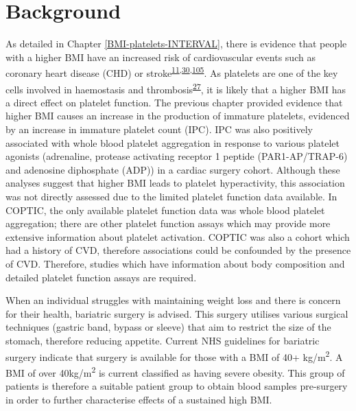 \documentclass[11pt,twoside]{bristolthesis}
\begin{document}
\hypertarget{background-2}{%
\section{Background}\label{background-2}}

As detailed in Chapter \ref{BMI-platelets-INTERVAL}, there is evidence that people with a higher BMI have an increased risk of cardiovascular events such as coronary heart disease (CHD) or stroke\textsuperscript{\protect\hyperlink{ref-Nordestgaard2012}{11},\protect\hyperlink{ref-Dale2017}{30},\protect\hyperlink{ref-Wolk2003a}{105}}. As platelets are one of the key cells involved in haemostasis and thrombosis\textsuperscript{\protect\hyperlink{ref-Koupenova2017a}{27}}, it is likely that a higher BMI has a direct effect on platelet function. The previous chapter provided evidence that higher BMI causes an increase in the production of immature platelets, evidenced by an increase in immature platelet count (IPC). IPC was also positively associated with whole blood platelet aggregation in response to various platelet agonists (adrenaline, protease activating receptor 1 peptide (PAR1-AP/TRAP-6) and adenosine diphosphate (ADP)) in a cardiac surgery cohort. Although these analyses suggest that higher BMI leads to platelet hyperactivity, this association was not directly assessed due to the limited platelet function data available. In COPTIC, the only available platelet function data was whole blood platelet aggregation; there are other platelet function assays which may provide more extensive information about platelet activation. COPTIC was also a cohort which had a history of CVD, therefore associations could be confounded by the presence of CVD. Therefore, studies which have information about body composition and detailed platelet function assays are required.

When an individual struggles with maintaining weight loss and there is concern for their health, bariatric surgery is advised. This surgery utilises various surgical techniques (gastric band, bypass or sleeve) that aim to restrict the size of the stomach, therefore reducing appetite. Current NHS guidelines for bariatric surgery indicate that surgery is available for those with a BMI of 40+ kg/m\textsuperscript{2}. A BMI of over 40kg/m\textsuperscript{2} is current classified as having severe obesity. This group of patients is therefore a suitable patient group to obtain blood samples pre-surgery in order to further characterise effects of a sustained high BMI.
\end{document}

